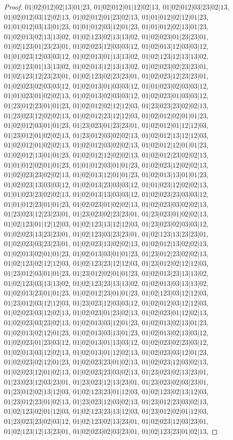 \documentclass[12pt]{article}
\theoremstyle{plain}
\theoremstyle{definition}
\theoremstyle{remark}
\begin{document}
\begin{proof}
$01|02|012|02|13|01|23$, $01|02|012|01|12|02|13$, $01|02|012|03|23|02|13$, $01|02|012|03|12|02|13$, $01|02|012|01|23|02|13$, $01|01|012|02|12|01|23$, $01|01|012|03|13|01|23$, $01|01|012|03|12|01|23$, $01|01|012|02|13|01|23$, $01|02|013|02|13|13|02$, $01|02|123|02|13|13|02$, $01|02|023|01|23|23|01$, $01|02|123|01|23|23|01$, $01|02|023|12|03|03|12$, $01|02|013|12|03|03|12$, $01|01|023|12|03|03|12$, $01|02|013|01|13|13|02$, $01|02|123|12|13|13|02$, $01|02|123|01|13|13|02$, $01|02|013|12|13|13|02$, $01|02|023|02|23|23|01$, $01|02|123|12|23|23|01$, $01|02|123|02|23|23|01$, $01|02|023|12|23|23|01$, $01|02|023|02|03|03|12$, $01|02|013|01|03|03|12$, $01|01|023|02|03|03|12$, $01|01|023|01|02|02|13$, $01|02|013|02|03|03|12$, $01|02|023|01|03|03|12$, $01|23|012|23|01|01|23$, $01|02|012|02|12|12|03$, $01|23|023|23|02|02|13$, $01|23|023|12|02|02|13$, $01|02|012|23|12|12|03$, $01|02|012|02|01|01|23$, $01|02|012|03|01|01|23$, $01|23|023|01|23|23|01$, $01|02|012|01|12|12|03$, $01|23|012|01|02|02|13$, $01|23|012|03|02|02|13$, $01|02|012|13|12|12|03$, $01|02|012|01|02|02|13$, $01|02|012|03|02|02|13$, $01|02|012|12|01|01|23$, $01|02|012|13|01|01|23$, $01|02|012|12|02|02|13$, $01|02|012|23|02|02|13$, $01|01|012|02|01|01|23$, $01|01|012|03|01|01|23$, $01|02|023|12|02|02|13$, $01|02|023|23|02|02|13$, $01|02|013|12|01|01|23$, $01|02|013|13|01|01|23$, $01|02|023|13|03|03|12$, $01|02|013|23|03|03|12$, $01|01|023|12|02|02|13$, $01|01|023|23|02|02|13$, $01|02|013|13|03|03|12$, $01|02|023|23|03|03|12$, $01|01|012|23|01|01|23$, $01|02|023|01|02|02|13$, $01|02|023|03|02|02|13$, $01|23|023|12|23|23|01$, $01|23|023|02|23|23|01$, $01|23|023|01|02|02|13$, $01|02|123|01|12|12|03$, $01|02|123|13|12|12|03$, $01|23|023|02|03|03|12$, $01|02|023|13|23|23|01$, $01|02|123|03|23|23|01$, $01|02|123|13|23|23|01$, $01|02|023|03|23|23|01$, $01|02|023|13|02|02|13$, $01|02|012|13|02|02|13$, $01|02|013|02|01|01|23$, $01|02|013|03|01|01|23$, $01|23|012|23|02|02|13$, $01|02|123|02|12|12|03$, $01|02|123|23|12|12|03$, $01|23|012|02|12|12|03$, $01|23|012|03|01|01|23$, $01|23|012|02|01|01|23$, $01|02|013|23|13|13|02$, $01|02|123|03|13|13|02$, $01|02|123|23|13|13|02$, $01|02|013|03|13|13|02$, $01|02|013|23|01|01|23$, $01|02|012|23|01|01|23$, $01|02|123|03|12|12|03$, $01|23|012|03|12|12|03$, $01|23|023|12|03|03|12$, $01|02|012|03|12|12|03$, $01|02|023|03|12|02|13$, $01|02|023|01|23|02|13$, $01|02|023|01|12|02|13$, $01|02|023|03|23|02|13$, $01|02|013|03|12|01|23$, $01|02|013|02|13|01|23$, $01|02|013|02|12|01|23$, $01|02|013|03|13|01|23$, $01|02|013|02|13|03|12$, $01|02|023|01|23|03|12$, $01|02|013|01|13|03|12$, $01|02|023|02|23|03|12$, $01|02|013|03|12|02|13$, $01|02|013|01|12|02|13$, $01|02|023|03|12|01|23$, $01|02|023|02|12|01|23$, $01|02|023|23|01|02|13$, $01|02|023|12|03|02|13$, $01|02|023|12|01|02|13$, $01|02|023|23|03|02|13$, $01|23|023|02|13|23|01$, $01|23|023|12|03|23|01$, $01|23|023|12|13|23|01$, $01|23|023|02|03|23|01$, $01|23|012|02|13|12|03$, $01|02|123|23|01|12|03$, $01|02|123|02|13|12|03$, $01|23|012|23|01|02|13$, $01|23|023|12|03|02|13$, $01|23|012|23|03|02|13$, $01|02|123|02|01|12|03$, $01|02|123|23|13|12|03$, $01|23|012|02|01|12|03$, $01|23|023|23|02|03|12$, $01|02|123|02|13|23|01$, $01|02|023|12|03|23|01$, $01|02|123|12|13|23|01$, $01|02|023|02|03|23|01$, $01|02|123|23|01|02|13$, 
\end{proof}
\end{document}
